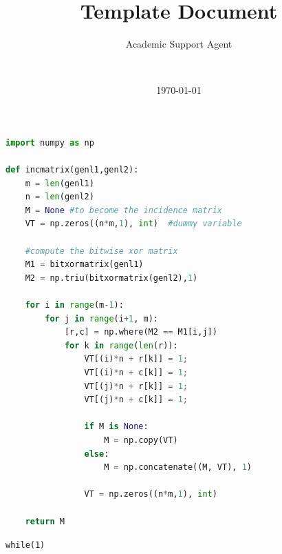 \documentclass{article}
\title{Template Document}
\author{Academic Support Agent}
\date{\today}
\begin{document}
\maketitle

\author{ ~ ~ }
\teacher{ ~ ~ \quad  }
\subject{ ~ ~ ~ }
\academy{ ~ ~ ~ ~ ~ ~ }
\subtitle{ }
\makecover







\section{ }
 \cite{ 1979 }
\begin{lstlisting}[language=Python, caption=Python example]
import numpy as np
    
def incmatrix(genl1,genl2):
    m = len(genl1)
    n = len(genl2)
    M = None #to become the incidence matrix
    VT = np.zeros((n*m,1), int)  #dummy variable
    
    #compute the bitwise xor matrix
    M1 = bitxormatrix(genl1)
    M2 = np.triu(bitxormatrix(genl2),1) 

    for i in range(m-1):
        for j in range(i+1, m):
            [r,c] = np.where(M2 == M1[i,j])
            for k in range(len(r)):
                VT[(i)*n + r[k]] = 1;
                VT[(i)*n + c[k]] = 1;
                VT[(j)*n + r[k]] = 1;
                VT[(j)*n + c[k]] = 1;
                
                if M is None:
                    M = np.copy(VT)
                else:
                    M = np.concatenate((M, VT), 1)
                
                VT = np.zeros((n*m,1), int)
    
    return M
\end{lstlisting}
 \verb|while(1)|

\newpage



\section{   }






\newpage

\end{document}
